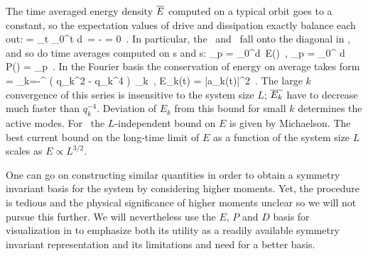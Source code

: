 The time averaged energy density  $\overline{E}$
computed on a typical orbit goes to a constant, so
the expectation values  of drive and dissipation
exactly balance each out:
\beq
      =
    \lim_{t\rightarrow \infty}
         \int_0^t d\tau \, \dot{\expctE}
=
       - 
= 0
    \,.
In particular, the \eqva\
and \reqva\ fall onto the diagonal in ,
and so do time averages computed on \po s and \rpo s:
\beq
{}_p =
 \int_0^d\tau \, E(\tau)
    \,,\qquad
{}_p =
 \int_0^ d\tau \, P(\tau)
    =
      _p
    \,.
\label{poE}
\eeq
In the Fourier basis  the conservation of energy on average
takes form
 = \sum_{k=-\infty}^{\infty} ( q_k^2 - q_k^4 )\,
    _k
\,,\qquad
E_k(t) =  {\textstyle{}} |a_k(t)|^2
\,.
The large $k$ convergence of this series is insensitive to the
system size $L$; $\overline{E_k}$ have to decrease much faster than
$q_k^{-4}$.
Deviation of $E_k$ from this bound for small $k$ determines the active modes.
For \eqva\ the $L$-independent bound
    on $E$ is given by Michaelson.
The best current bound on the long-time limit
of $E$
as a function of the system size $L$ scales as
$E \propto L^{3/2}$.

One can go on constructing similar quantities in
order to obtain a symmetry invariant basis for the system by
considering higher moments. Yet, the procedure is tedious and
the physical significance of higher moments unclear so we
will not pursue this further. We will nevertheless use the
$E,\,P$ and $D$ basis for visualization in
 to emphasize both its utility as a
readily available symmetry invariant representation and its
limitations and need for a better basis.
